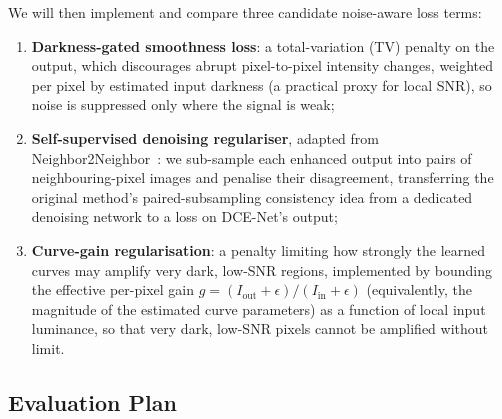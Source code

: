 \documentclass[11pt, letterpaper]{article}
\begin{document}
We will then implement and compare three candidate noise-aware loss terms:

\begin{enumerate}[noitemsep]
  \item \textbf{Darkness-gated smoothness loss}: a total-variation (TV) penalty on the output, which discourages abrupt pixel-to-pixel intensity changes, weighted per pixel by estimated input darkness (a practical proxy for local SNR), so noise is suppressed only where the signal is weak;
  \item \textbf{Self-supervised denoising regulariser}, adapted from Neighbor2Neighbor~\cite{huang2021n2n}: we sub-sample each enhanced output into pairs of neighbouring-pixel images and penalise their disagreement, transferring the original method's paired-subsampling consistency idea from a dedicated denoising network to a loss on DCE-Net's output;
  \item \textbf{Curve-gain regularisation}: a penalty limiting how strongly the learned curves may amplify very dark, low-SNR regions, implemented by bounding the effective per-pixel gain $g = (I_{\text{out}} + \epsilon)/(I_{\text{in}} + \epsilon)$ (equivalently, the magnitude of the estimated curve parameters) as a function of local input luminance, so that very dark, low-SNR pixels cannot be amplified without limit.
\end{enumerate}

\subsection{Evaluation Plan}
\end{document}
